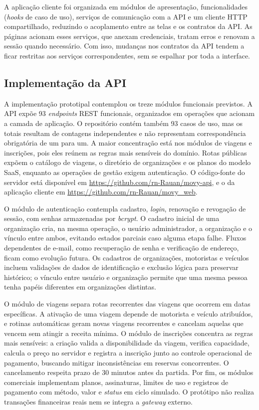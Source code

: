 \documentclass[a4paper,12pt]{article}
\begin{document}
A aplicação cliente foi organizada em módulos de apresentação, funcionalidades (\textit{hooks} de caso de uso), serviços de comunicação com a API e um cliente HTTP compartilhado, reduzindo o acoplamento entre as telas e os contratos da API. As páginas acionam esses serviços, que anexam credenciais, tratam erros e renovam a sessão quando necessário. Com isso, mudanças nos contratos da API tendem a ficar restritas aos serviços correspondentes, sem se espalhar por toda a interface.

\subsection{Implementação da API}
\label{sec:implementacao}

A implementação prototipal contemplou os treze módulos funcionais previstos. A API expõe 93 \textit{endpoints} REST funcionais, organizados em operações que acionam a camada de aplicação. O repositório contém também 93 casos de uso, mas os totais resultam de contagens independentes e não representam correspondência obrigatória de um para um. A maior concentração está nos módulos de viagens e inscrições, pois eles reúnem as regras mais sensíveis do domínio. Rotas públicas expõem o catálogo de viagens, o diretório de organizações e os planos do modelo SaaS, enquanto as operações de gestão exigem autenticação. O código-fonte do servidor está disponível em \url{https://github.com/rn-Rauan/movy-api}, e o da aplicação cliente em \url{https://github.com/rn-Rauan/movy_web}.

O módulo de autenticação contempla cadastro, \textit{login}, renovação e revogação de sessão, com senhas armazenadas por \textit{bcrypt}. O cadastro inicial de uma organização cria, na mesma operação, o usuário administrador, a organização e o vínculo entre ambos, evitando estados parciais caso alguma etapa falhe. Fluxos dependentes de e-mail, como recuperação de senha e verificação de endereço, ficam como evolução futura. Os cadastros de organizações, motoristas e veículos incluem validações de dados de identificação e exclusão lógica para preservar histórico; o vínculo entre usuário e organização permite que uma mesma pessoa tenha papéis diferentes em organizações distintas.

O módulo de viagens separa rotas recorrentes das viagens que ocorrem em datas específicas. A ativação de uma viagem depende de motorista e veículo atribuídos, e rotinas automáticas geram novas viagens recorrentes e cancelam aquelas que vencem sem atingir a receita mínima. O módulo de inscrições concentra as regras mais sensíveis: a criação valida a disponibilidade da viagem, verifica capacidade, calcula o preço no servidor e registra a inscrição junto ao controle operacional de pagamento, buscando mitigar inconsistências em reservas concorrentes. O cancelamento respeita prazo de 30 minutos antes da partida. Por fim, os módulos comerciais implementam planos, assinaturas, limites de uso e registros de pagamento com método, valor e \textit{status} em ciclo simulado. O protótipo não realiza transações financeiras reais nem se integra a \textit{gateway} externo.
\end{document}

